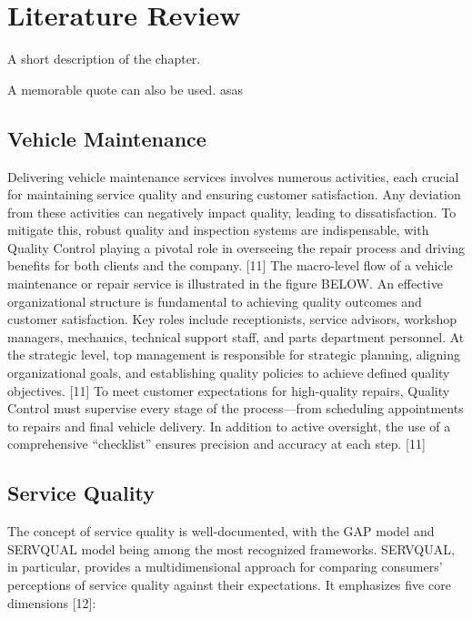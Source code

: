 \chapter{Literature Review}%
\label{chapter:literatureReview}

\begin{introduction}
A short description of the chapter.

A memorable quote can also be used. asas
\end{introduction} 


\section{Vehicle Maintenance}

Delivering vehicle maintenance services involves numerous activities, each crucial for maintaining service quality and ensuring customer satisfaction. Any deviation from these activities can negatively impact quality, leading to dissatisfaction. To mitigate this, robust quality and inspection systems are indispensable, with Quality Control playing a pivotal role in overseeing the repair process and driving benefits for both clients and the company. [11]
The macro-level flow of a vehicle maintenance or repair service is illustrated in the figure BELOW. An effective organizational structure is fundamental to achieving quality outcomes and customer satisfaction. Key roles include receptionists, service advisors, workshop managers, mechanics, technical support staff, and parts department personnel. At the strategic level, top management is responsible for strategic planning, aligning organizational goals, and establishing quality policies to achieve defined quality objectives. [11]
To meet customer expectations for high-quality repairs, Quality Control must supervise every stage of the process—from scheduling appointments to repairs and final vehicle delivery. In addition to active oversight, the use of a comprehensive “checklist” ensures precision and accuracy at each step. [11]

\section{Service Quality}
The concept of service quality is well-documented, with the GAP model and SERVQUAL model being among the most recognized frameworks. SERVQUAL, in particular, provides a multidimensional approach for comparing consumers’ perceptions of service quality against their expectations. It emphasizes five core dimensions [12]:

